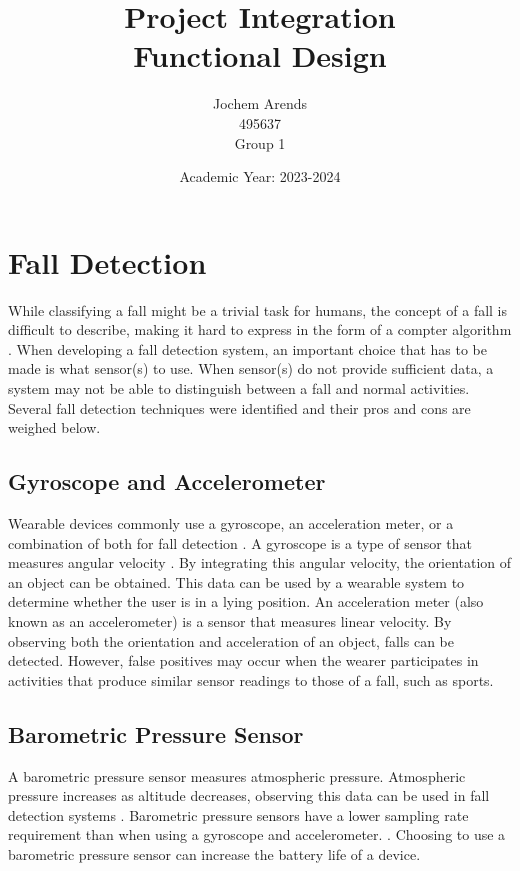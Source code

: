 \documentclass{article}
\title{Project Integration \\ Functional Design}
\author{Jochem Arends \\ 495637 \\ Group 1}
\date{Academic Year: 2023-2024}
\begin{document}
\maketitle
\newpage

\tableofcontents
\clearpage

\section{Fall Detection}

While classifying a fall might be a trivial task for humans, the concept of a fall is difficult to describe, making it hard to express in the form of a compter algorithm \cite{noury-2007}.
When developing a fall detection system, an important choice that has to be made is what sensor(s) to use.
When sensor(s) do not provide sufficient data, a system may not be able to distinguish between a fall and normal activities.
Several fall detection techniques were identified and their pros and cons are weighed below.

\subsection{Gyroscope and Accelerometer}

Wearable devices commonly use a gyroscope, an acceleration meter, or a combination of both for fall detection \cite{delahoz-2014}.
A gyroscope is a type of sensor that measures angular velocity \cite{passaro-2017}.
By integrating this angular velocity, the orientation of an object can be obtained.
This data can be used by a wearable system to determine whether the user is in a lying position.
An acceleration meter (also known as an accelerometer) is a sensor that measures linear velocity.
By observing both the orientation and acceleration of an object, falls can be detected.
However, false positives may occur when the wearer participates in activities that produce similar sensor readings to those of a fall, such as sports.

\subsection{Barometric Pressure Sensor}

A barometric pressure sensor measures atmospheric pressure.
Atmospheric pressure increases as altitude decreases, observing this data can be used in fall detection systems \cite{sun-2019}.
Barometric pressure sensors have a lower sampling rate requirement than when using a gyroscope and accelerometer. \cite{sun-2019}.
Choosing to use a barometric pressure sensor can increase the battery life of a device.
\end{document}

